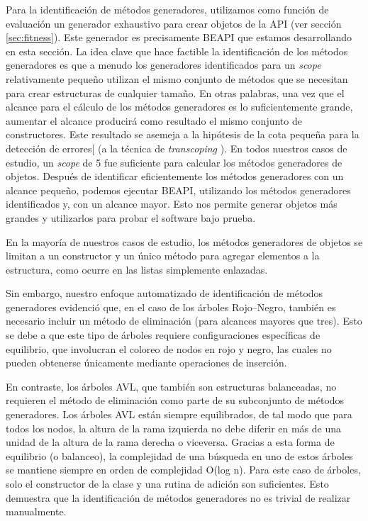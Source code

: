 Para la identificación de métodos generadores, utilizamos como función de evaluación un generador exhaustivo para crear objetos de la API (ver sección \ref{sec:fitness}). 
Este generador es precisamente BEAPI que estamos desarrollando en esta sección. 
La idea clave que hace factible la identificación de los métodos generadores es que a menudo los generadores identificados para un \emph{scope} relativamente pequeño 
utilizan el mismo conjunto de métodos que se necesitan para crear estructuras de cualquier tamaño.
En otras palabras, una vez que el alcance para el cálculo de los métodos generadores es lo suficientemente grande, aumentar el alcance producirá como resultado el mismo conjunto de constructores. 
Este resultado se asemeja a la hipótesis de la cota pequeña para la detección de errores[\cite{Andoni02} (a la técnica de \emph{transcoping} \cite{Rosner13}).
En todos nuestros casos de estudio, un \emph{scope} de 5 fue suficiente para calcular los métodos generadores de objetos. 
Después de identificar eficientemente los métodos generadores con un alcance pequeño, podemos ejecutar \textsf{BEAPI}, utilizando los métodos generadores identificados y,
con un alcance mayor. Esto nos permite generar objetos más grandes y utilizarlos para probar el software bajo prueba.

En la mayoría de nuestros casos de estudio, los métodos generadores de objetos se limitan a un 
constructor y un único método para agregar elementos a la estructura, como ocurre en las listas 
simplemente enlazadas.  

Sin embargo, nuestro enfoque automatizado de identificación de métodos generadores evidenció que, 
en el caso de los árboles Rojo–Negro, también es necesario incluir un método de eliminación 
(para alcances mayores que tres).  
Esto se debe a que este tipo de árboles requiere configuraciones específicas de equilibrio, 
que involucran el coloreo de nodos en rojo y negro, las cuales no pueden obtenerse únicamente 
mediante operaciones de inserción.


En contraste, los árboles AVL,
que también son estructuras balanceadas, no requieren el método de eliminación como parte de su subconjunto de métodos generadores.
Los árboles AVL están siempre equilibrados, 
de tal modo que para todos los nodos, la altura de la rama izquierda no debe diferir en más de una unidad de la altura de la rama derecha o viceversa. 
Gracias a esta forma de equilibrio (o balanceo), la complejidad de una búsqueda en uno de estos árboles se mantiene siempre en orden de complejidad O(log n). 
Para este caso de árboles, solo el constructor de la clase y una rutina de adición son suficientes. 
Esto demuestra que la identificación de métodos generadores no es trivial de realizar manualmente.

